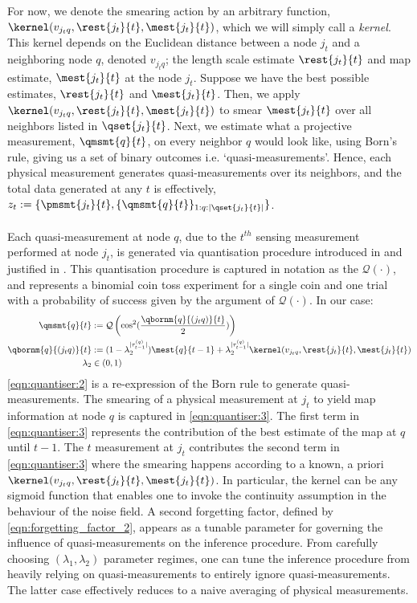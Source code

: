 For now, we denote the smearing action by an arbitrary function, $\kernel(v_{j_tq},\rest{j_t}{t}, \mest{j_t}{t})$, which we will simply call a \textit{kernel}. This kernel depends on the Euclidean distance between a node $j_t$ and a neighboring node $q$, denoted $v_{j_tq}$; the length scale estimate $\rest{j_t}{t}$ and map estimate, $\mest{j_t}{t}$ at the node $j_t$. Suppose we have the best possible estimates, $\rest{j_t}{t}$ and $\mest{j_t}{t}$.  Then, we apply $\kernel(v_{j_tq},\rest{j_t}{t}, \mest{j_t}{t})$ to smear $\mest{j_t}{t}$ over all neighbors listed in $\qset{j_t}{t}$. Next, we estimate what a projective measurement, $\qmsmt{q}{t}$, on every neighbor $q$ would look like, using Born's rule, giving us a set of binary outcomes i.e. `quasi-measurements'. Hence, each physical measurement generates quasi-measurements over its neighbors, and the total data generated at any $t$ is effectively, $z_t := \{\pmsmt{j_t}{t}, \{ \qmsmt{q}{t} \}_{1:q:|\qset{j_t}{t}|}\}$.\\
\\
Each quasi-measurement at node $q$, due to the $t^{th}$ sensing measurement performed at node $j_t$, is generated via quantisation procedure introduced in \cite{gupta2018machine} and justified in \cite{riddhinotes}. This quantisation procedure is captured in notation as the $\mathcal{Q}(\cdot)$, and represents a binomial coin toss experiment for a single coin and one trial with a probability of success given by the argument of $\mathcal{Q}(\cdot)$. In our case:
\\
\begin{align}
	\qmsmt{q}{t} & :=\mathcal{Q}\left( \cos^2(\frac{\qbornm{q}{(j_tq)}{t}}{2}) \label{eqn:quantiser:2} \right) \\
	\qbornm{q}{(j_tq)}{t} & :=  (1 - \lambda_2^{|\tau^{(q)}_{t-1}|})\mest{q}{t-1} + \lambda_2^{|\tau^{(q)}_{t-1}|}\kernel(v_{j_tq},\rest{j_t}{t}, \mest{j_t}{t}) \label{eqn:quantiser:3} \\
	\lambda_2 &\in (0,1) \label{eqn:forgetting_factor_2}
\end{align} \cref{eqn:quantiser:2} is a re-expression of the Born rule to generate quasi-measurements. The smearing of a physical measurement at $j_t$ to yield map information at node $q$ is captured in \cref{eqn:quantiser:3}. The first term in \cref{eqn:quantiser:3} represents the contribution of the best estimate of the map at $q$ until $t-1$. The $t$ measurement at $j_t$ contributes the second term in \cref{eqn:quantiser:3} where the smearing happens according to a known, a priori $\kernel(v_{j_tq},\rest{j_t}{t}, \mest{j_t}{t})$. In particular,  the kernel can be any sigmoid function that enables one to invoke the continuity assumption in the behaviour of the noise field. A second forgetting factor, defined by \cref{eqn:forgetting_factor_2}, appears as a tunable parameter for governing the influence of quasi-measurements on the inference procedure. From carefully choosing $(\lambda_1, \lambda_2)$ parameter regimes, one can tune the inference procedure from heavily relying on quasi-measurements  to entirely ignore quasi-measurements. The latter case effectively reduces to a naive averaging of physical measurements.\\
